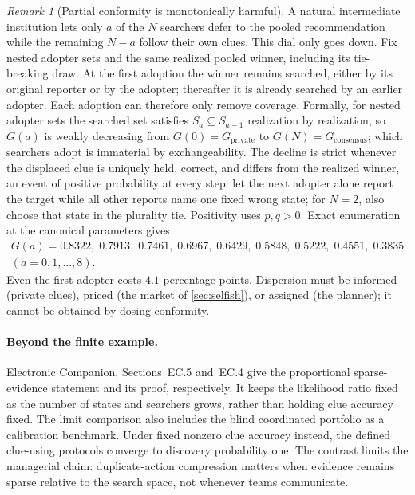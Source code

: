 \documentclass[11pt]{article}
\theoremstyle{definition}
\theoremstyle{remark}
\newtheorem{remark}{Remark}
\newcommand{\1}{\mathbf{1}}
\newcommand{\priv}{\mathrm{private}}
\newcommand{\cons}{\mathrm{consensus}}
\begin{document}
\begin{remark}[Partial conformity is monotonically harmful]
\label{rem:conformity}
A natural intermediate institution lets only $a$ of the $N$ searchers defer to the pooled recommendation while the remaining $N-a$ follow their own clues. This dial only goes down. Fix nested adopter sets and the same realized pooled winner, including its tie-breaking draw. At the first adoption the winner remains searched, either by its original reporter or by the adopter; thereafter it is already searched by an earlier adopter. Each adoption can therefore only remove coverage. Formally, for nested adopter sets the searched set satisfies $S_a\subseteq S_{a-1}$ realization by realization, so $G(a)$ is weakly decreasing from $G(0)=G_{\priv}$ to $G(N)=G_{\cons}$; which searchers adopt is immaterial by exchangeability. The decline is strict whenever the displaced clue is uniquely held, correct, and differs from the realized winner, an event of positive probability at every step: let the next adopter alone report the target while all other reports name one fixed wrong state; for $N=2$, also choose that state in the plurality tie. Positivity uses $p,q>0$. Exact enumeration at the canonical parameters gives
\[
\begin{gathered}G(a)=0.8322,\;0.7913,\;0.7461,\;0.6967,\;0.6429,\;0.5848,\;0.5222,\;0.4551,\;0.3835\\ (a=0,1,\ldots,8).\end{gathered}
\]
Even the first adopter costs $4.1$ percentage points. Dispersion must be informed (private clues), priced (the market of \cref{sec:selfish}), or assigned (the planner); it cannot be obtained by dosing conformity.
\end{remark}

\paragraph{Beyond the finite example.}
Electronic Companion, Sections~EC.5 and~EC.4 give the proportional sparse-evidence statement and its proof, respectively. It keeps the likelihood ratio fixed as the number of states and searchers grows, rather than holding clue accuracy fixed. The limit comparison also includes the blind coordinated portfolio as a calibration benchmark. Under fixed nonzero clue accuracy instead, the defined clue-using protocols converge to discovery probability one. The contrast limits the managerial claim: duplicate-action compression matters when evidence remains sparse relative to the search space, not whenever teams communicate.
\end{document}
